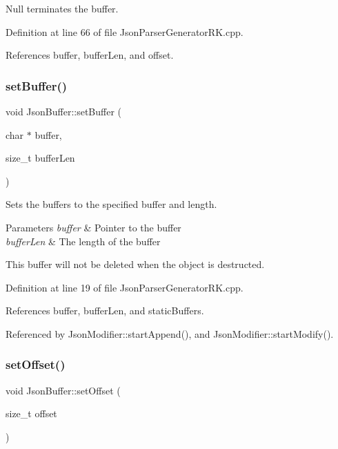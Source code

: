 Null terminates the buffer. 



Definition at line 66 of file Json\+Parser\+Generator\+R\+K.\+cpp.



References buffer, buffer\+Len, and offset.

\mbox{\label{class_json_buffer_a6721ab2b50d9b0bfc64d51c84c295230}} 
\subsubsection{\texorpdfstring{set\+Buffer()}{setBuffer()}}
{\footnotesize\ttfamily void Json\+Buffer\+::set\+Buffer (\begin{DoxyParamCaption}\item[{char $\ast$}]{buffer,  }\item[{size\+\_\+t}]{buffer\+Len }\end{DoxyParamCaption})}



Sets the buffers to the specified buffer and length. 


\begin{DoxyParams}{Parameters}
{\em buffer} & Pointer to the buffer\\
\hline
{\em buffer\+Len} & The length of the buffer\\
\hline
\end{DoxyParams}
This buffer will not be deleted when the object is destructed. 

Definition at line 19 of file Json\+Parser\+Generator\+R\+K.\+cpp.



References buffer, buffer\+Len, and static\+Buffers.



Referenced by Json\+Modifier\+::start\+Append(), and Json\+Modifier\+::start\+Modify().

\mbox{\label{class_json_buffer_a0043413c56e23d83f3b4dbe508a35315}} 
\subsubsection{\texorpdfstring{set\+Offset()}{setOffset()}}
{\footnotesize\ttfamily void Json\+Buffer\+::set\+Offset (\begin{DoxyParamCaption}\item[{size\+\_\+t}]{offset }\end{DoxyParamCaption})\hspace{0.3cm}{\ttfamily [inline]}}



